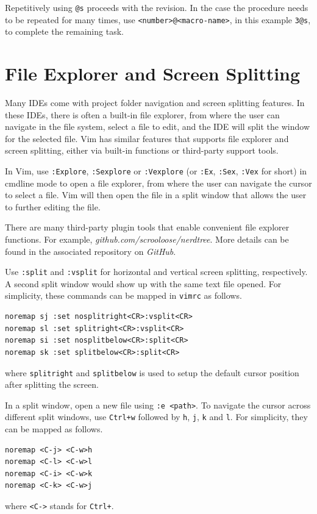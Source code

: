 Repetitively using \verb|@s| proceeds with the revision. In the case the procedure needs to be repeated for many times, use \verb|<number>@<macro-name>|, in this example \verb|3@s|, to complete the remaining task.

\section{File Explorer and Screen Splitting}

Many IDEs come with project folder navigation and screen splitting features. In these IDEs, there is often a built-in file explorer, from where the user can navigate in the file system, select a file to edit, and the IDE will split the window for the selected file. Vim has similar features that supports file explorer and screen splitting, either via built-in functions or third-party support tools.

In Vim, use \verb|:Explore|, \verb|:Sexplore| or \verb|:Vexplore| (or \verb|:Ex|, \verb|:Sex|, \verb|:Vex| for short) in cmdline mode to open a file explorer, from where the user can navigate the cursor to select a file. Vim will then open the file in a split window that allows the user to further editing the file.

There are many third-party plugin tools that enable convenient file explorer functions. For example, \textit{github.com/scrooloose/nerdtree}. More details can be found in the associated repository on \textit{GitHub}.

Use \verb|:split| and \verb|:vsplit| for horizontal and vertical screen splitting, respectively. A second split window would show up with the same text file opened. For simplicity, these commands can be mapped in \verb|vimrc| as follows.
\begin{lstlisting}
noremap sj :set nosplitright<CR>:vsplit<CR>
noremap sl :set splitright<CR>:vsplit<CR>
noremap si :set nosplitbelow<CR>:split<CR>
noremap sk :set splitbelow<CR>:split<CR>
\end{lstlisting}
where \verb|splitright| and \verb|splitbelow| is used to setup the default cursor position after splitting the screen.

In a split window, open a new file using \verb|:e <path>|. To navigate the cursor across different split windows, use \verb|Ctrl+w| followed by \verb|h|, \verb|j|, \verb|k| and \verb|l|. For simplicity, they can be mapped as follows.
\begin{lstlisting}
noremap <C-j> <C-w>h
noremap <C-l> <C-w>l
noremap <C-i> <C-w>k
noremap <C-k> <C-w>j
\end{lstlisting}
where \verb|<C->| stands for \verb|Ctrl+|.

